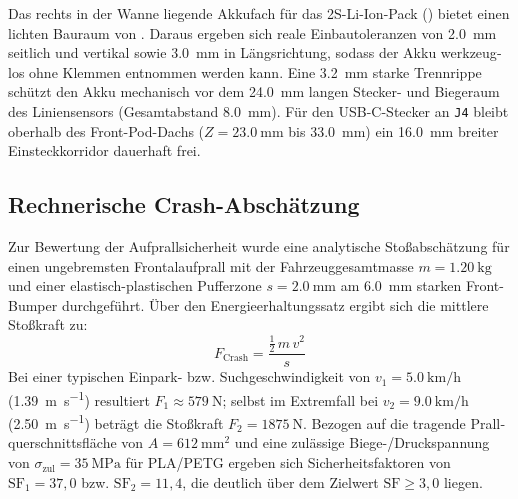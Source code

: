 \begin{otherlanguage}{ngerman}
Das rechts in der Wanne liegende Akkufach für das 2S-Li-Ion-Pack () bietet einen lichten Bauraum von . Daraus ergeben sich reale Einbautoleranzen von \SI{+2.0}{\milli\metre} seitlich und vertikal sowie \SI{+3.0}{\milli\metre} in Längsrichtung, sodass der Akku werkzeuglos ohne Klemmen entnommen werden kann. Eine \SI{3.2}{\milli\metre} starke Trennrippe schützt den Akku mechanisch vor dem \SI{24.0}{\milli\metre} langen Stecker- und Biegeraum des Liniensensors (Gesamtabstand \SI{8.0}{\milli\metre}). Für den USB-C-Stecker an \texttt{J4} bleibt oberhalb des Front-Pod-Dachs ($Z = \SI{23.0}{\milli\metre}$ bis \SI{33.0}{\milli\metre}) ein \SI{16.0}{\milli\metre} breiter Einsteckkorridor dauerhaft frei.

\subsection{Rechnerische Crash-Abschätzung}
Zur Bewertung der Aufprallsicherheit wurde eine analytische Stoßabschätzung für einen ungebremsten Frontalaufprall mit der Fahrzeuggesamtmasse $m = \SI{1.20}{\kilogram}$ und einer elastisch-plastischen Pufferzone $s = \SI{2.0}{\milli\metre}$ am \SI{6.0}{\milli\metre} starken Front-Bumper durchgeführt. Über den Energieerhaltungssatz ergibt sich die mittlere Stoßkraft zu:
\begin{equation}
  F_{\text{Crash}} = \frac{\frac{1}{2}\,m\,v^2}{s}
  \label{eq:crash_kraft}
\end{equation}
Bei einer typischen Einpark- bzw. Suchgeschwindigkeit von $v_1 = \SI{5.0}{\kilo\metre\per\hour}$ (\SI{1.39}{\metre\per\second}) resultiert $F_1 \approx \SI{579}{\newton}$; selbst im Extremfall bei $v_2 = \SI{9.0}{\kilo\metre\per\hour}$ (\SI{2.50}{\metre\per\second}) beträgt die Stoßkraft $F_2 = \SI{1875}{\newton}$. Bezogen auf die tragende Prallquerschnittsfläche von $A = \SI{612}{\milli\metre\squared}$ und eine zulässige Biege-/Druckspannung von $\sigma_{\text{zul}} = \SI{35}{\mega\pascal}$ für PLA/PETG ergeben sich Sicherheitsfaktoren von $\text{SF}_1 = 37{,}0$ bzw. $\text{SF}_2 = 11{,}4$, die deutlich über dem Zielwert $\text{SF} \ge 3{,}0$ liegen.

\end{otherlanguage}
